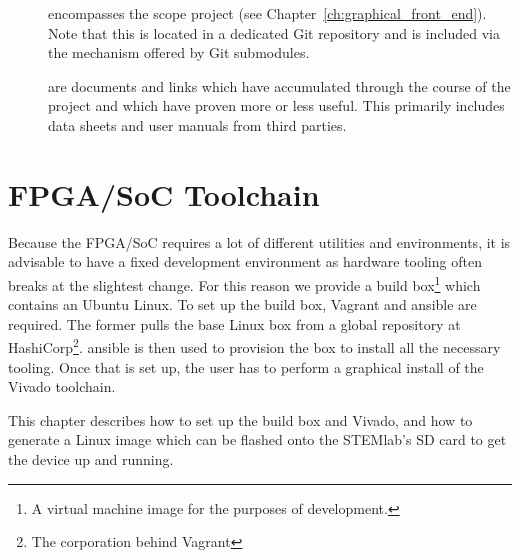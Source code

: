 \begin{minipage}[t]{0.64\textwidth}
\begin{description}
        \item[]    encompasses    the    scope    project    (see
            Chapter~\ref{ch:graphical_front_end}).  Note that  this is located
            in a  dedicated Git repository  and is included via  the mechanism
            offered by Git submodules.

        \item[]   are   documents   and  links   which   have
            accumulated  through the  course  of the  project  and which  have
            proven more or  less useful.  This primarily  includes data sheets
            and user manuals from third parties.
    \end{description}
\end{minipage}
\vspace*{2ex}



%
%
\chapter{FPGA/SoC Toolchain} %
\label{ch:devguide:fpga_toolchain}

Because the FPGA/SoC requires a lot of different utilities and environments, it
is advisable to  have a fixed development environment as  hardware tooling often
breaks at the slightest change.
For this reason we  provide a build box\footnote{%
    A virtual machine image for the purposes of development.
}
which contains  an Ubuntu Linux. To set  up the build box, Vagrant  and ansible
are required.  The former pulls the base Linux box from a global repository at
HashiCorp\footnote{The corporation  behind Vagrant}.  ansible is then  used to
provision the box  to install all the necessary tooling. Once  that is set up,
the user has to perform a graphical install of the Vivado toolchain.

This chapter  describes how to  set up  the build box  and Vivado, and  how to
generate a Linux image which can be  flashed onto the STEMlab's SD card to get
the device up and running.

